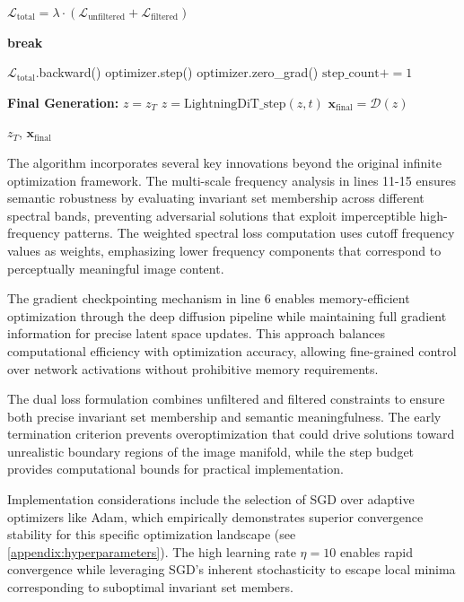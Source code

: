 \begin{algorithm}[H]
\begin{algorithmic}[1]
    \State $\mathcal{L}_{\text{total}} = \lambda \cdot (\mathcal{L}_{\text{unfiltered}} + \mathcal{L}_{\text{filtered}})$ 
    
     
        \State \textbf{break} 
    \EndIf
    
    \State $\mathcal{L}_{\text{total}}$.backward() 
    \State $\text{optimizer}$.step() 
    \State $\text{optimizer}$.zero\_grad() 
    \State $\text{step\_count} += 1$ 
\EndWhile

\State \textbf{Final Generation:} 
\State $z = z_T$ 
 
    \State $z = \text{LightningDiT\_step}(z, t)$
\EndFor
\State $\mathbf{x}_{\text{final}} = \mathcal{D}(z)$ 

\State \Return $z_T$, $\mathbf{x}_{\text{final}}$ 
\end{algorithmic}
\end{algorithm}

The algorithm incorporates several key innovations beyond the original infinite optimization framework. The multi-scale frequency analysis in lines 11-15 ensures semantic robustness by evaluating invariant set membership across different spectral bands, preventing adversarial solutions that exploit imperceptible high-frequency patterns. The weighted spectral loss computation uses cutoff frequency values as weights, emphasizing lower frequency components that correspond to perceptually meaningful image content.

The gradient checkpointing mechanism in line 6 enables memory-efficient optimization through the deep diffusion pipeline while maintaining full gradient information for precise latent space updates. This approach balances computational efficiency with optimization accuracy, allowing fine-grained control over network activations without prohibitive memory requirements.

The dual loss formulation combines unfiltered and filtered constraints to ensure both precise invariant set membership and semantic meaningfulness. The early termination criterion prevents overoptimization that could drive solutions toward unrealistic boundary regions of the image manifold, while the step budget provides computational bounds for practical implementation.

Implementation considerations include the selection of SGD over adaptive optimizers like Adam, which empirically demonstrates superior convergence stability for this specific optimization landscape (see \cref{appendix:hyperparameters}). The high learning rate $\eta = 10$ enables rapid convergence while leveraging SGD's inherent stochasticity to escape local minima corresponding to suboptimal invariant set members.
